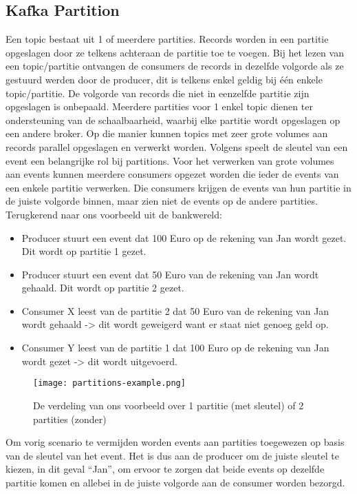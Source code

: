 \subsection{Kafka Partition}
Een topic bestaat uit 1 of meerdere partities. Records worden in een partitie opgeslagen door ze telkens achteraan de partitie toe te voegen. Bij het lezen van een topic/partitie ontvangen de consumers de records in dezelfde volgorde als ze gestuurd werden door de producer, dit is telkens enkel geldig bij één enkele topic/partitie. De volgorde van records die niet in eenzelfde partitie zijn opgeslagen is onbepaald.
Meerdere partities voor 1 enkel topic dienen ter ondersteuning van de schaalbaarheid, waarbij elke partitie wordt opgeslagen op een andere broker. Op die manier kunnen topics met zeer grote volumes aan records parallel opgeslagen en verwerkt worden.
\newline
\newline
Volgens \textcite{Harbour2023} speelt de sleutel van een event een belangrijke rol bij partitions. Voor het verwerken van grote volumes aan events kunnen meerdere consumers opgezet worden die ieder de events van een enkele partitie verwerken. Die consumers krijgen de events van hun partitie in de juiste volgorde binnen, maar zien niet de events op de andere partities. Terugkerend naar ons voorbeeld uit de bankwereld:
\begin{itemize}
    \item Producer stuurt een event dat 100 Euro op de rekening van Jan wordt gezet. Dit wordt op partitie 1 gezet.
    \item Producer stuurt een event dat 50 Euro van de rekening van Jan wordt gehaald. Dit wordt op partitie 2 gezet.
    \item Consumer X leest van de partitie 2 dat 50 Euro van de rekening van Jan wordt gehaald -> dit wordt geweigerd want er staat niet genoeg geld op.
    \item Consumer Y leest van de partitie 1 dat 100 Euro op de rekening van Jan wordt gezet -> dit wordt uitgevoerd.
\end{itemize}

\begin{figure}[H]
    \texttt{[image: partitions-example.png]}
    \caption{De verdeling van ons voorbeeld over 1 partitie (met sleutel) of 2 partities (zonder)}
\end{figure}

Om vorig scenario te vermijden worden events aan partities toegewezen op basis van de sleutel van het event. Het is dus aan de producer om de juiste sleutel te kiezen, in dit geval ``Jan'', om ervoor te zorgen dat beide events op dezelfde partitie komen en allebei in de juiste volgorde aan de consumer worden bezorgd.
\newline
\newline


